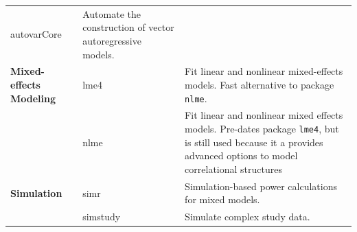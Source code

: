 \documentclass[]{book}
\begin{document}
\begin{longtable}[]{@{}lll@{}}
\begin{minipage}[t]{0.23\columnwidth}
autovarCore\strut
\end{minipage} & \begin{minipage}[t]{0.48\columnwidth}\raggedright\strut
Automate the construction of vector autoregressive models.\strut
\end{minipage}\tabularnewline
\begin{minipage}[t]{0.21\columnwidth}\raggedright\strut
\textbf{Mixed-effects Modeling}\strut
\end{minipage} & \begin{minipage}[t]{0.23\columnwidth}\raggedright\strut
lme4\strut
\end{minipage} & \begin{minipage}[t]{0.48\columnwidth}\raggedright\strut
Fit linear and nonlinear mixed-effects models. Fast alternative to
package \texttt{nlme}.\strut
\end{minipage}\tabularnewline
\begin{minipage}[t]{0.21\columnwidth}\raggedright\strut
\strut
\end{minipage} & \begin{minipage}[t]{0.23\columnwidth}\raggedright\strut
nlme\strut
\end{minipage} & \begin{minipage}[t]{0.48\columnwidth}\raggedright\strut
Fit linear and nonlinear mixed effects models. Pre-dates package
\texttt{lme4}, but is still used because it a provides advanced options
to model correlational structures\strut
\end{minipage}\tabularnewline
\begin{minipage}[t]{0.21\columnwidth}\raggedright\strut
\textbf{Simulation}\strut
\end{minipage} & \begin{minipage}[t]{0.23\columnwidth}\raggedright\strut
simr\strut
\end{minipage} & \begin{minipage}[t]{0.48\columnwidth}\raggedright\strut
Simulation-based power calculations for mixed models.\strut
\end{minipage}\tabularnewline
\begin{minipage}[t]{0.21\columnwidth}\raggedright\strut
\strut
\end{minipage} & \begin{minipage}[t]{0.23\columnwidth}\raggedright\strut
simstudy\strut
\end{minipage} & \begin{minipage}[t]{0.48\columnwidth}\raggedright\strut
Simulate complex study data.\strut

\end{minipage}
\end{longtable}
\end{document}
